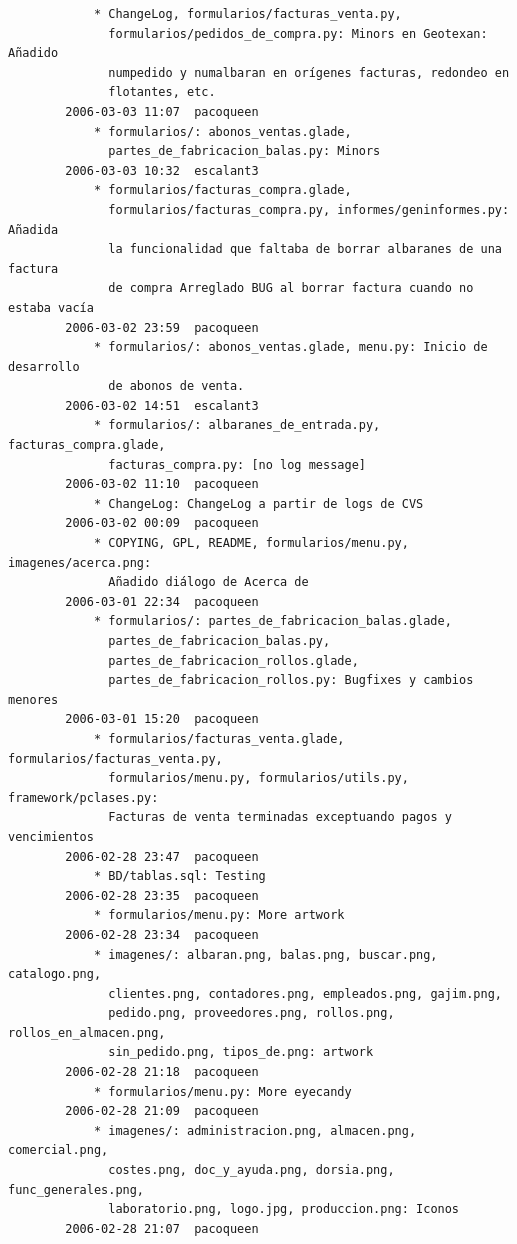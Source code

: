 \documentclass[a4paper]{article}
\begin{document}
\begin{verbatim}
            * ChangeLog, formularios/facturas_venta.py,
              formularios/pedidos_de_compra.py: Minors en Geotexan: Añadido
              numpedido y numalbaran en orígenes facturas, redondeo en
              flotantes, etc.
        2006-03-03 11:07  pacoqueen
            * formularios/: abonos_ventas.glade,
              partes_de_fabricacion_balas.py: Minors
        2006-03-03 10:32  escalant3
            * formularios/facturas_compra.glade,
              formularios/facturas_compra.py, informes/geninformes.py: Añadida
              la funcionalidad que faltaba de borrar albaranes de una factura
              de compra Arreglado BUG al borrar factura cuando no estaba vacía
        2006-03-02 23:59  pacoqueen
            * formularios/: abonos_ventas.glade, menu.py: Inicio de desarrollo
              de abonos de venta.
        2006-03-02 14:51  escalant3
            * formularios/: albaranes_de_entrada.py, facturas_compra.glade,
              facturas_compra.py: [no log message]
        2006-03-02 11:10  pacoqueen
            * ChangeLog: ChangeLog a partir de logs de CVS
        2006-03-02 00:09  pacoqueen
            * COPYING, GPL, README, formularios/menu.py, imagenes/acerca.png:
              Añadido diálogo de Acerca de
        2006-03-01 22:34  pacoqueen
            * formularios/: partes_de_fabricacion_balas.glade,
              partes_de_fabricacion_balas.py,
              partes_de_fabricacion_rollos.glade,
              partes_de_fabricacion_rollos.py: Bugfixes y cambios menores
        2006-03-01 15:20  pacoqueen
            * formularios/facturas_venta.glade, formularios/facturas_venta.py,
              formularios/menu.py, formularios/utils.py, framework/pclases.py:
              Facturas de venta terminadas exceptuando pagos y vencimientos
        2006-02-28 23:47  pacoqueen
            * BD/tablas.sql: Testing
        2006-02-28 23:35  pacoqueen
            * formularios/menu.py: More artwork
        2006-02-28 23:34  pacoqueen
            * imagenes/: albaran.png, balas.png, buscar.png, catalogo.png,
              clientes.png, contadores.png, empleados.png, gajim.png,
              pedido.png, proveedores.png, rollos.png, rollos_en_almacen.png,
              sin_pedido.png, tipos_de.png: artwork
        2006-02-28 21:18  pacoqueen
            * formularios/menu.py: More eyecandy
        2006-02-28 21:09  pacoqueen
            * imagenes/: administracion.png, almacen.png, comercial.png,
              costes.png, doc_y_ayuda.png, dorsia.png, func_generales.png,
              laboratorio.png, logo.jpg, produccion.png: Iconos
        2006-02-28 21:07  pacoqueen

\end{verbatim}
\end{document}
